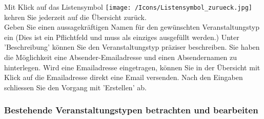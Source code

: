 Mit Klick auf das Listensymbol \texttt{[image: /Icons/Listensymbol\_zurueck.jpg]}  kehren Sie jederzeit auf die Übersicht zurück.\\
Geben Sie einen aussagekräftigen Namen  für den gewünschten Veranstaltungstyp ein (Dies ist ein Pflichtfeld und muss als einziges ausgefüllt werden.) Unter 'Beschreibung'  können Sie den Veranstaltungstyp präziser beschreiben. Sie haben die Möglichkeit eine Absender-Emailadresse  und einen Absendernamen  zu hinterlegen. Wird eine Emailadresse eingetragen, können Sie in der Übersicht mit Klick auf die Emailadresse direkt eine Email versenden. Nach den Eingaben schliessen Sie den Vorgang mit 'Erstellen'  ab.

\subsubsection{Bestehende Veranstaltungstypen betrachten und bearbeiten}

